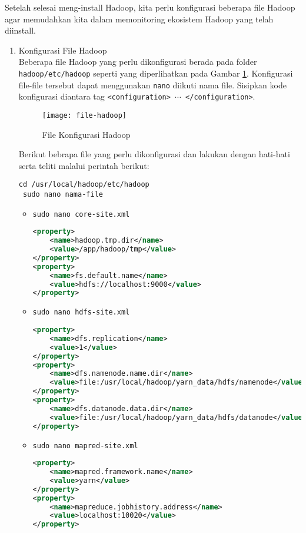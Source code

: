 \documentclass[a4paper]{tufte-handout}
\begin{document}

Setelah selesai meng-install Hadoop, kita perlu konfigurasi beberapa file Hadoop agar memudahkan kita dalam memonitoring ekosistem Hadoop yang telah diinstall.

\begin{enumerate}
\item Konfigurasi File Hadoop \\
Beberapa file Hadoop yang perlu dikonfigurasi berada pada folder {\tt hadoop/etc/hadoop} seperti yang diperlihatkan pada Gambar \ref{gam:file-hadoop}. Konfigurasi file-file tersebut dapat menggunakan {\tt nano} diikuti nama file. Sisipkan kode konfigurasi diantara tag {\tt <configuration> $\cdots$ </configuration>}.

\begin{figure}[!ht]
\texttt{[image: file-hadoop]}
\caption{File Konfigurasi Hadoop}
\label{gam:file-hadoop}
\end{figure}

Berikut bebrapa file yang perlu dikonfigurasi dan lakukan dengan hati-hati serta teliti malalui perintah berikut:
\begin{lstlisting}[language=Terminal]
 cd /usr/local/hadoop/etc/hadoop
 sudo nano nama-file
\end{lstlisting}

\begin{itemize}

\item {\tt sudo nano core-site.xml}
\begin{lstlisting}[language=XML]
<property>
	<name>hadoop.tmp.dir</name>
	<value>/app/hadoop/tmp</value>
</property>
<property>
	<name>fs.default.name</name>
	<value>hdfs://localhost:9000</value>
</property>
\end{lstlisting}

\item {\tt sudo nano hdfs-site.xml}
\begin{lstlisting}[language=XML]
<property>
	<name>dfs.replication</name>
	<value>1</value>
</property>
<property>
	<name>dfs.namenode.name.dir</name>
	<value>file:/usr/local/hadoop/yarn_data/hdfs/namenode</value>
</property>
<property>
	<name>dfs.datanode.data.dir</name>
	<value>file:/usr/local/hadoop/yarn_data/hdfs/datanode</value>
</property>
\end{lstlisting}

\item {\tt sudo nano mapred-site.xml}
\begin{lstlisting}[language=XML]
<property>
	<name>mapred.framework.name</name>
	<value>yarn</value>
</property>
<property>
	<name>mapreduce.jobhistory.address</name>
	<value>localhost:10020</value>
</property>
\end{lstlisting}


\end{itemize}
\end{enumerate}
\end{document}
